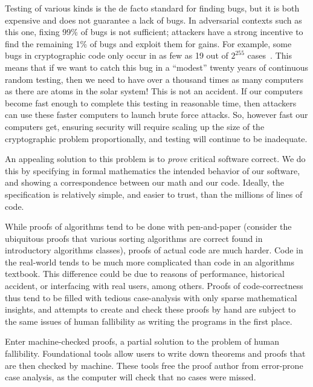 Testing of various kinds is the de facto standard for finding bugs, but it is both expensive and does not guarantee a lack of bugs.
In adversarial contexts such as this one, fixing 99\% of bugs is not sufficient; attackers have a strong incentive to find the remaining 1\% of bugs and exploit them for gains.
For example, some bugs in cryptographic code only occur in as few as 19 out of $2^{255}$ cases~\cite{curve25519-donna-commit-correct-bounds}.
This means that if we want to catch this bug in a ``modest'' twenty years of continuous random testing, then we need to have over a thousand times as many computers as there are atoms in the solar system!
This is not an accident.
If our computers become fast enough to complete this testing in reasonable time, then attackers can use these faster computers to launch brute force attacks.
So, however fast our computers get, ensuring security will require scaling up the size of the cryptographic problem proportionally, and testing will continue to be inadequate.

An appealing solution to this problem is to \emph{prove} critical software correct.
We do this by specifying in formal mathematics the intended behavior of our software, and showing a correspondence between our math and our code.
Ideally, the specification is relatively simple, and easier to trust, than the millions of lines of code.

While proofs of algorithms tend to be done with pen-and-paper (consider the ubiquitous proofs that various sorting algorithms are correct found in introductory algorithms classes), proofs of actual code are much harder.
Code in the real-world tends to be much more complicated than code in an algorithms textbook.
This difference could be due to reasons of performance, historical accident, or interfacing with real users, among others.
Proofs of code-correctness thus tend to be filled with tedious case-analysis with only sparse mathematical insights, and attempts to create and check these proofs by hand are subject to the same issues of human fallibility as writing the programs in the first place.

Enter machine-checked proofs, a partial solution to the problem of human fallibility.
Foundational tools allow users to write down theorems and proofs that are then checked by machine.
These tools free the proof author from error-prone case analysis, as the computer will check that no cases were missed.

